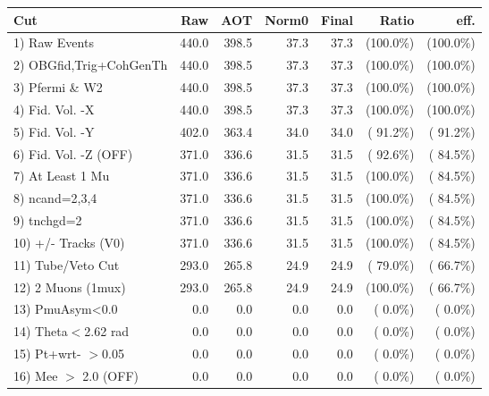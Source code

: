  \begin{table}[h!]\centering
 \begin{tabular}{||l||r|r|r|r|r|r||}
 \hline
 \hline
 Cut & Raw & AOT & Norm0 & Final & Ratio & eff.       \\
 \hline
  1) Raw Events           &        440.0 &        398.5 &         37.3 &         37.3 & (100.0\%) & (100.0\%) \\
  2) OBGfid,Trig+CohGenTh &        440.0 &        398.5 &         37.3 &         37.3 & (100.0\%) & (100.0\%) \\
  3) Pfermi \& W2         &        440.0 &        398.5 &         37.3 &         37.3 & (100.0\%) & (100.0\%) \\
  4) Fid. Vol. -X         &        440.0 &        398.5 &         37.3 &         37.3 & (100.0\%) & (100.0\%) \\
  5) Fid. Vol. -Y         &        402.0 &        363.4 &         34.0 &         34.0 & ( 91.2\%) & ( 91.2\%) \\
  6) Fid. Vol. -Z (OFF)   &        371.0 &        336.6 &         31.5 &         31.5 & ( 92.6\%) & ( 84.5\%) \\
  7) At Least 1 Mu        &        371.0 &        336.6 &         31.5 &         31.5 & (100.0\%) & ( 84.5\%) \\
  8) ncand=2,3,4          &        371.0 &        336.6 &         31.5 &         31.5 & (100.0\%) & ( 84.5\%) \\
  9) tnchgd=2             &        371.0 &        336.6 &         31.5 &         31.5 & (100.0\%) & ( 84.5\%) \\
 10) +/- Tracks (V0)      &        371.0 &        336.6 &         31.5 &         31.5 & (100.0\%) & ( 84.5\%) \\
 11) Tube/Veto Cut        &        293.0 &        265.8 &         24.9 &         24.9 & ( 79.0\%) & ( 66.7\%) \\
 12) 2 Muons (1mux)       &        293.0 &        265.8 &         24.9 &         24.9 & (100.0\%) & ( 66.7\%) \\
 13) PmuAsym<0.0          &          0.0 &          0.0 &          0.0 &          0.0 & (  0.0\%) & (  0.0\%) \\
 14) Theta$<$2.62 rad     &          0.0 &          0.0 &          0.0 &          0.0 & (  0.0\%) & (  0.0\%) \\
 15) Pt+wrt- $>$0.05      &          0.0 &          0.0 &          0.0 &          0.0 & (  0.0\%) & (  0.0\%) \\
 16) Mee $>$ 2.0  (OFF)   &          0.0 &          0.0 &          0.0 &          0.0 & (  0.0\%) & (  0.0\%) \\

\end{tabular}
\end{table}

